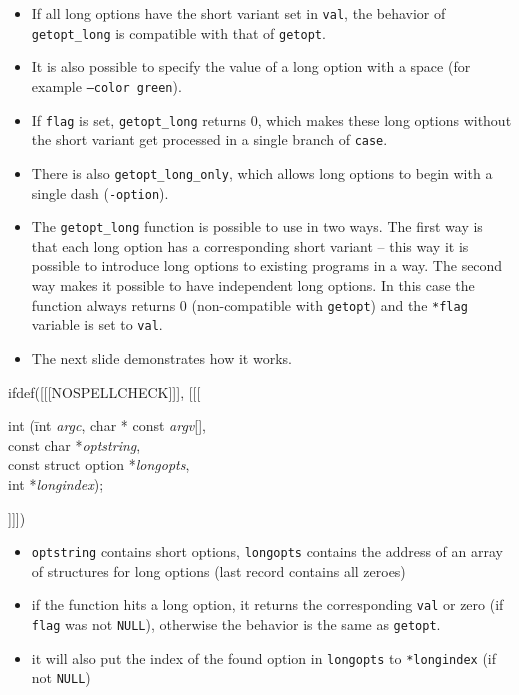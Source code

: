 \begin{itemize}
\item If all long options have the short variant set in \texttt{val}, the
behavior of \texttt{getopt\_long} is compatible with that of \texttt{getopt}.
\item It is also possible to specify the value of a long option with a space
(for example \texttt{--color~green}).
\item If \texttt{flag} is set, \texttt{getopt\_long} returns 0, which makes
these long options without the short variant get processed in a single branch of
\texttt{case}.
\item There is also \texttt{getopt\_long\_only}, which allows long options
to begin with a single dash (\texttt{-option}).
\item The \texttt{getopt\_long} function is possible to use in two ways.
The first way is that each long option has a corresponding short variant
-- this way it is possible to introduce long options to existing programs
in a  way. The second way makes it possible to have
independent long options. In this case the function always returns 0
(non-compatible with \texttt{getopt}) and the \texttt{*flag} variable
is set to \texttt{val}.
\item The next slide demonstrates how it works.
\end{itemize}


\begin{slide}
ifdef([[[NOSPELLCHECK]]], [[[
{\tt\begin{tabbing}
int (\=int \emph{argc}, char * const \emph{argv}[],\\
\>const char *\emph{optstring},\\
\>const struct option *\emph{longopts},\\
\>int *\emph{longindex}); 
\end{tabbing}}
]]])
\begin{itemize}
\item \texttt{optstring} contains short options,
\texttt{longopts} contains the address of an array of structures for long options
(last record contains all zeroes) 
\item if the function hits a long option, it returns the corresponding
\texttt{val} or zero (if \texttt{flag} was not \texttt{NULL}),
otherwise the behavior is the same as \texttt{getopt}.
\item it will also put the index of the found option in \texttt{longopts}
to \texttt{*longindex} (if not \texttt{NULL})
\end{itemize}
\end{slide}

